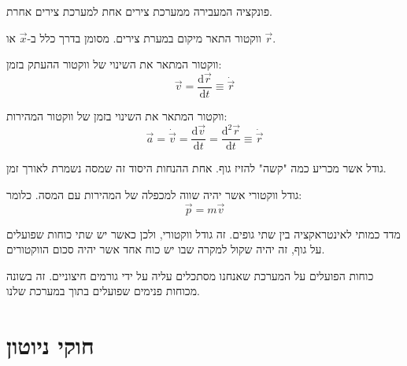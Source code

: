 \documentclass{tstextbook}
\begin{document}
\begin{definition}
פונקציה המעבירה ממערכת צירים אחת למערכת צירים אחרת.

\end{definition}
\begin{proposition}
\end{proposition}
\begin{definition}
ווקטור התאר מיקום במערת צירים. מסומן בדרך כלל ב-\(\vec{x}\) או \(\vec{r}\).

\end{definition}
\begin{definition}
ווקטור המתאר את השינוי של ווקטור ההעתק בזמן:
$$\vec{v}=\frac{\mathrm{d} \vec{r}}{\mathrm{d} t} \equiv \dot{\vec{r}}$$

\end{definition}
\begin{definition}
ווקטור המתאר את השינוי בזמן של ווקטור המהירות:
$$\vec{a}=\dot{\vec{v}}=\frac{\mathrm{d} \vec{v}}{\mathrm{d} t} =\frac{\mathrm{d} ^2\vec{r}}{\mathrm{d} t} \equiv \dot{\vec{r}} $$

\end{definition}
\begin{definition}[מסה]
גודל אשר מכריע כמה "קשה" להזיז גוף. אחת ההנחות היסוד זה שמסה נשמרת לאורך זמן. 

\end{definition}
\begin{definition}[תנע]
גודל ווקטורי אשר יהיה שווה למכפלה של המהירות עם המסה. כלומר:
$$\vec{p}=m\vec{v}$$

\end{definition}
\begin{definition}[כוח]
מדד כמותי לאינטראקציה בין שתי גופים. זה גודל ווקטורי, ולכן כאשר יש שתי כוחות שפועלים על גוף, זה יהיה שקול למקרה שבו יש כוח אחד אשר יהיה סכום הווקטורים.

\end{definition}
\begin{definition}
כוחות הפועלים על המערכת שאנחנו מסתכלים עליה על ידי גורמים חיצוניים. זה בשונה מכוחות פנימים שפועלים בתוך במערכת שלנו.

\end{definition}
\section{חוקי ניוטון}
\end{document}
